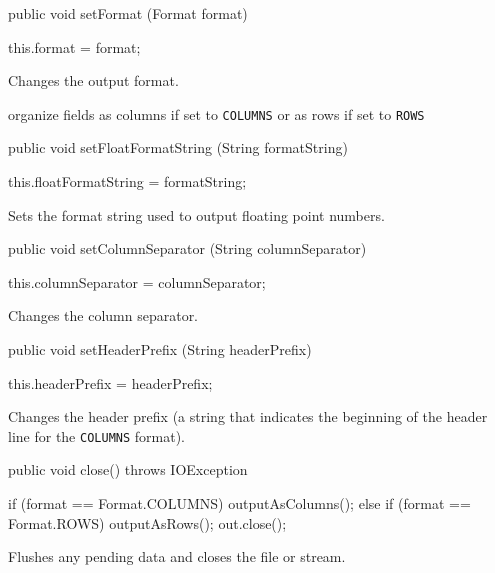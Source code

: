 \begin{code}
   public void setFormat (Format format) \begin{hide} {
      this.format = format;
   }
   \end{hide}
\end{code}
\begin{tabb}
Changes the output format.
\end{tabb}
\begin{htmlonly}
      {organize fields as columns if set to \texttt{COLUMNS} or as rows if set to \texttt{ROWS}}
\end{htmlonly}
\begin{code}

   public void setFloatFormatString (String formatString) \begin{hide} {
      this.floatFormatString = formatString;
   }
   \end{hide}
\end{code}
\begin{tabb}
Sets the format string used to output  floating point numbers.
\end{tabb}
\begin{htmlonly}
\end{htmlonly}
\begin{code}

   public void setColumnSeparator (String columnSeparator) \begin{hide} {
      this.columnSeparator = columnSeparator;
   }
   \end{hide}
\end{code}
\begin{tabb}
Changes the column separator.
\end{tabb}
\begin{code}

   public void setHeaderPrefix (String headerPrefix) \begin{hide} {
      this.headerPrefix = headerPrefix;
   }
   \end{hide}
\end{code}
\begin{tabb}
Changes the header prefix (a string that indicates the beginning of the header line for the \texttt{COLUMNS} format).
\end{tabb}
\begin{code}

   public void close() throws IOException \begin{hide} {
      if (format == Format.COLUMNS)
         outputAsColumns();
      else if (format == Format.ROWS)
         outputAsRows();
      out.close();
   }
   \end{hide}
\end{code}
\begin{tabb}
Flushes any pending data and closes the file or stream.
\end{tabb}

\begin{code}\begin{hide}
}
\end{hide}\end{code}
